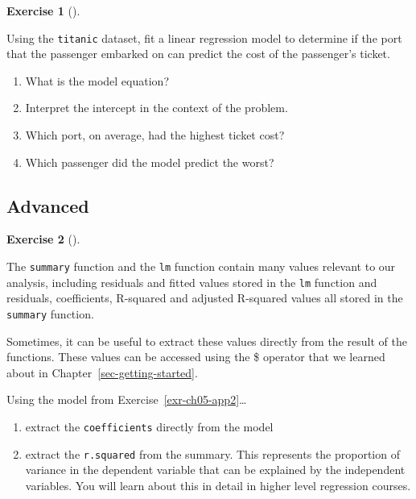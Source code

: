 \documentclass[
  letterpaper,
  DIV=11,
  numbers=noendperiod]{scrreprt}
\providecommand{\tightlist}{%
  \setlength{\itemsep}{0pt}\setlength{\parskip}{0pt}}\usepackage{longtable,booktabs,array}
\theoremstyle{definition}
\newtheorem{exercise}{Exercise}[chapter]
\theoremstyle{remark}
\begin{document}
\begin{exercise}[]\protect\hypertarget{exr-ch05-app3}{}\label{exr-ch05-app3}

Using the \texttt{titanic} dataset, fit a linear regression model to
determine if the port that the passenger embarked on can predict the
cost of the passenger's ticket.

\begin{enumerate}
\def\labelenumi{\alph{enumi})}
\tightlist
\item
  What is the model equation?
\item
  Interpret the intercept in the context of the problem.
\item
  Which port, on average, had the highest ticket cost?
\item
  Which passenger did the model predict the worst?
\end{enumerate}

\end{exercise}

\hypertarget{sec-ex05-advanced}{%
\subsection{Advanced}\label{sec-ex05-advanced}}

\begin{exercise}[]\protect\hypertarget{exr-ch05-adv1}{}\label{exr-ch05-adv1}

The \texttt{summary} function and the \texttt{lm} function contain many
values relevant to our analysis, including residuals and fitted values
stored in the \texttt{lm} function and residuals, coefficients,
R-squared and adjusted R-squared values all stored in the
\texttt{summary} function.

Sometimes, it can be useful to extract these values directly from the
result of the functions. These values can be accessed using the \$
operator that we learned about in Chapter~\ref{sec-getting-started}.

Using the model from Exercise~\ref{exr-ch05-app2}\ldots{}

\begin{enumerate}
\def\labelenumi{\alph{enumi})}
\tightlist
\item
  extract the \texttt{coefficients} directly from the model
\item
  extract the \texttt{r.squared} from the summary. This represents the
  proportion of variance in the dependent variable that can be explained
  by the independent variables. You will learn about this in detail in
  higher level regression courses.
\end{enumerate}

\end{exercise}
\end{document}
